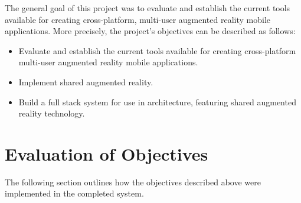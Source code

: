The general goal of this project was to evaluate and establish the current tools available for creating cross-platform, multi-user augmented reality mobile applications. More precisely, the project’s objectives can be described as follows:
\begin{itemize}
    \item Evaluate and establish the current tools available for creating cross-platform multi-user augmented reality mobile applications.
     \item Implement shared augmented reality.
    \item Build a full stack system for use in architecture, featuring shared augmented reality technology. 

\end{itemize}
\section{Evaluation of Objectives}
The following section outlines how the objectives described above were implemented in the completed system.

